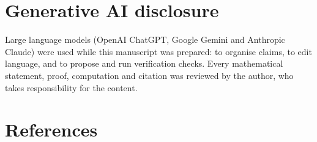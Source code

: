 \documentclass[
  11pt,
]{article}
\begin{document}
\hypertarget{generative-ai-disclosure}{%
\section{Generative AI disclosure}\label{generative-ai-disclosure}}

Large language models (OpenAI ChatGPT, Google Gemini and Anthropic
Claude) were used while this manuscript was prepared: to organise
claims, to edit language, and to propose and run verification checks.
Every mathematical statement, proof, computation and citation was
reviewed by the author, who takes responsibility for the content.

\clearpage

\hypertarget{references}{%
\section{References}\label{references}}
\end{document}
